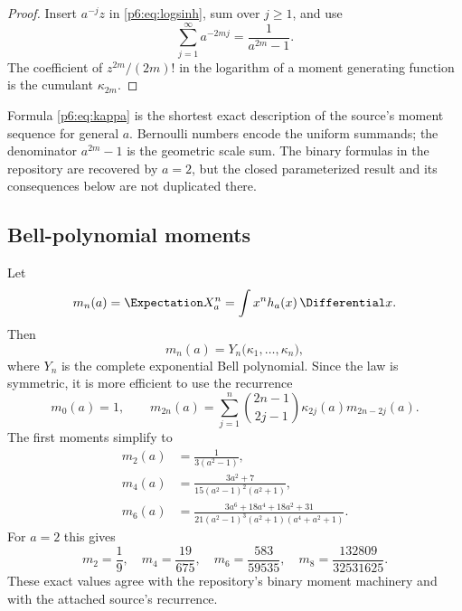 \documentclass[11pt,oneside]{article}
\numberwithin{equation}{section}
\theoremstyle{definition}
\theoremstyle{remark}
\begin{document}
\begin{proof}
Insert $a^{-j}z$ in \eqref{p6:eq:logsinh}, sum over $j\ge1$, and use
\[
 \sum_{j=1}^{\infty}a^{-2mj}=\frac1{a^{2m}-1}.
\]
The coefficient of $z^{2m}/(2m)!$ in the logarithm of a moment generating
function is the cumulant $\kappa_{2m}$.
\end{proof}

\begin{novelbox}
Formula \eqref{p6:eq:kappa} is the shortest exact description of the source's
moment sequence for general $a$.  Bernoulli numbers encode the uniform summands;
the denominator $a^{2m}-1$ is the geometric scale sum.  The binary formulas in
the repository are recovered by $a=2$, but the closed parameterized result and
its consequences below are not duplicated there.
\end{novelbox}

\subsection{Bell-polynomial moments}

Let
\[
 m_n(a)=\Expectation X_a^n=\int x^nh_a(x)\,\Differential x.
\]
Then
\begin{equation}\label{p6:eq:bell-moments}
 m_n(a)=Y_n\bigl(\kappa_1,\ldots,\kappa_n\bigr),
\end{equation}
where $Y_n$ is the complete exponential Bell polynomial.  Since the law is
symmetric, it is more efficient to use the recurrence
\begin{equation}\label{p6:eq:moment-recurrence}
 m_0(a)=1,
 \qquad
 m_{2n}(a)=\sum_{j=1}^{n}
 \binom{2n-1}{2j-1}
 \kappa_{2j}(a)m_{2n-2j}(a).
\end{equation}
The first moments simplify to
\begin{align}
 m_2(a)&=\frac1{3(a^2-1)},\label{p6:eq:m2}\\
 m_4(a)&=\frac{3a^2+7}{15(a^2-1)^2(a^2+1)},\label{p6:eq:m4}\\
 m_6(a)&=
 \frac{3a^6+18a^4+18a^2+31}
 {21(a^2-1)^3(a^2+1)(a^4+a^2+1)}.\label{p6:eq:m6}
\end{align}
For $a=2$ this gives
\begin{equation}\label{p6:eq:binary-moments}
 m_2=\frac19,
 \quad m_4=\frac{19}{675},
 \quad m_6=\frac{583}{59535},
 \quad m_8=\frac{132809}{32531625}.
\end{equation}
These exact values agree with the repository's binary moment machinery and with
the attached source's recurrence.
\end{document}
